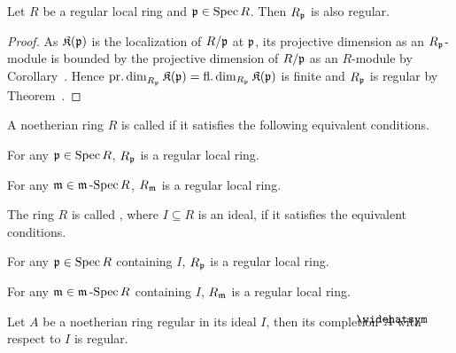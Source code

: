 \documentclass[a4paper,parskip=half,numbers=enddot, DIV=12]{scrreprt}
\begin{document}
\begin{cor}[Serre]
	Let $R$ be a regular local ring and $\mathfrak{p}\in\operatorname{Spec} R$. Then $R_{\mathfrak{p}}$ is also regular.
\end{cor}
\begin{proof}
	As $\mathfrak{K}(\mathfrak{p})$ is the localization of $R/\mathfrak{p}$ at $\mathfrak{p}$, its projective dimension as an $R_{\mathfrak{p}}$-module is bounded by the projective dimension of $R/\mathfrak{p}$ as an $R$-module by Corollary~. Hence $\operatorname{pr.dim}_{R_{\mathfrak{p}}}\mathfrak{K}(\mathfrak{p})=\operatorname{fl.dim}_{R_{\mathfrak{p}}}\mathfrak{K}(\mathfrak{p})$ is finite and $R_{\mathfrak{p}}$ is regular by Theorem~.
\end{proof}
\begin{defi}
	\begin{alphanumerate}
		\item A noetherian ring $R$ is called  if it satisfies the following equivalent conditions.
		\begin{alphanumerate}
			\item[\itememph{\alpha}] For any $\mathfrak{p}\in\operatorname{Spec} R$, $R_{\mathfrak{p}}$ is a regular local ring.
			\item[\itememph{\beta}] For any $\mathfrak{m}\in\mathfrak{m}\operatorname{-Spec} R$, $R_{\mathfrak{m}}$ is a regular local ring.
		\end{alphanumerate}
		\item The ring $R$ is called , where $I\subseteq R$ is an ideal, if it satisfies the equivalent conditions.
		\begin{alphanumerate}
			\item[\itememph{\alpha}] For any $\mathfrak{p}\in\operatorname{Spec} R$ containing $I$, $R_{\mathfrak{p}}$ is a regular local ring.
			\item[\itememph{\beta}] For any $\mathfrak{m}\in\mathfrak{m}\operatorname{-Spec} R$ containing $I$, $R_{\mathfrak{m}}$ is a regular local ring.
		\end{alphanumerate}
	\end{alphanumerate}
\end{defi}
\begin{prop}
	Let $A$ be a noetherian ring regular in its ideal $I$, then its completion $\roof{A}$ with respect to $I$ is regular.
\end{prop}
\end{document}
